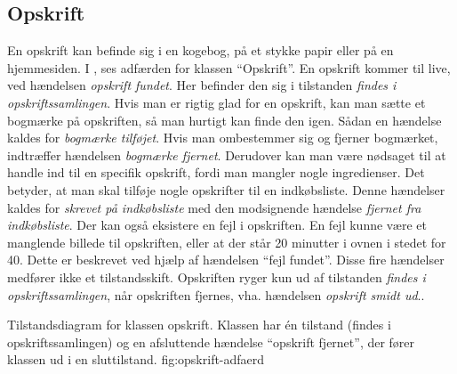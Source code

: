 \subsection{Opskrift}
En opskrift kan befinde sig i en kogebog, på et stykke papir eller på en hjemmesiden. I , ses adfærden for klassen ``Opskrift''. En opskrift kommer til live, ved hændelsen \textit{opskrift fundet}. Her befinder den sig i tilstanden \textit{findes i opskriftssamlingen}. Hvis man er rigtig glad for en opskrift, kan man sætte et bogmærke på opskriften, så man hurtigt kan finde den igen. Sådan en hændelse kaldes for \textit{bogmærke tilføjet}. Hvis man ombestemmer sig og fjerner bogmærket, indtræffer hændelsen \textit{bogmærke fjernet}. Derudover kan man være nødsaget til at handle ind til en specifik opskrift, fordi man mangler nogle ingredienser. Det betyder, at man skal tilføje nogle opskrifter til en indkøbsliste. Denne hændelser kaldes for \textit{skrevet på indkøbsliste} med den modsignende hændelse \textit{fjernet fra indkøbsliste}. Der kan også eksistere en fejl i opskriften. En fejl kunne være et manglende billede til opskriften, eller at der står 20 minutter i ovnen i stedet for 40. Dette er beskrevet ved hjælp af hændelsen ``fejl fundet''. Disse fire hændelser medfører ikke et tilstandsskift. Opskriften ryger kun ud af tilstanden \textit{findes i opskriftssamlingen}, når opskriften fjernes, vha. hændelsen \textit{opskrift smidt ud}..

  {Tilstandsdiagram for klassen opskrift. Klassen har én tilstand (findes i opskriftssamlingen) og en afsluttende hændelse ``opskrift fjernet'', der fører klassen ud i en sluttilstand.}
  {fig:opskrift-adfaerd}
